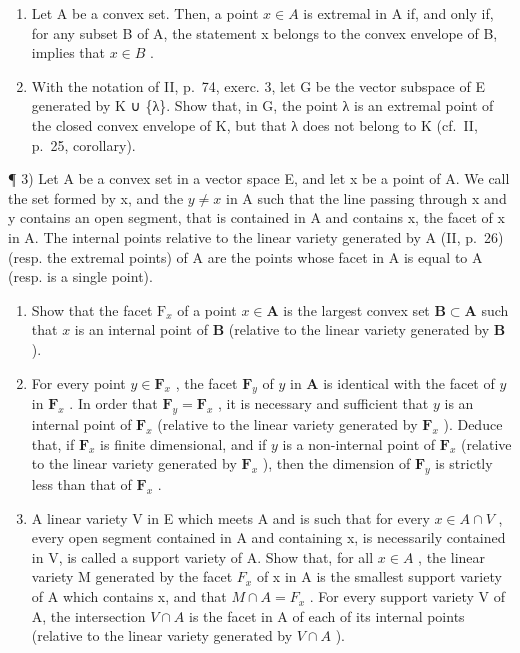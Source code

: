 \exercisegroup

\begin{enumerate}
\def\labelenumi{\arabic{enumi})}
\item
  Let A be a convex set. Then, a point \(x \in A\) is extremal in A if, and only if, for any subset B of A, the statement x belongs to the convex envelope of B, implies that \(x \in B\) .
\item
  With the notation of II, p.~74, exerc. 3, let G be the vector subspace of E generated by K ∪ \{λ\}. Show that, in G, the point λ is an extremal point of the closed convex envelope of K, but that λ does not belong to K (cf.~II, p.~25, corollary).
\end{enumerate}

¶ 3) Let A be a convex set in a vector space E, and let x be a point of A. We call the set formed by x, and the \(y \neq x\) in A such that the line passing through x and y contains an open segment, that is contained in A and contains x, the facet of x in A. The internal points relative to the linear variety generated by A (II, p.~26) (resp. the extremal points) of A are the points whose facet in A is equal to A (resp. is a single point).

\begin{enumerate}
\def\labelenumi{\alph{enumi})}
\item
  Show that the facet \(\mathrm{F}_x\) of a point \(x \in \mathbf{A}\) is the largest convex set \(\mathbf{B} \subset \mathbf{A}\) such that \(x\) is an internal point of \(\mathbf{B}\) (relative to the linear variety generated by \(\mathbf{B}\) ).
\item
  For every point \(y \in \mathbf{F}_x\) , the facet \(\mathbf{F}_y\) of \(y\) in \(\mathbf{A}\) is identical with the facet of \(y\) in \(\mathbf{F}_x\) . In order that \(\mathbf{F}_y = \mathbf{F}_x\) , it is necessary and sufficient that \(y\) is an internal point of \(\mathbf{F}_x\) (relative to the linear variety generated by \(\mathbf{F}_x\) ). Deduce that, if \(\mathbf{F}_x\) is finite dimensional, and if \(y\) is a non-internal point of \(\mathbf{F}_x\) (relative to the linear variety generated by \(\mathbf{F}_x\) ), then the dimension of \(\mathbf{F}_y\) is strictly less than that of \(\mathbf{F}_x\) .
\item
  A linear variety V in E which meets A and is such that for every \(x \in A \cap V\) , every open segment contained in A and containing x, is necessarily contained in V, is called a support variety of A. Show that, for all \(x \in A\) , the linear variety M generated by the facet \(F_{x}\) of x in A is the smallest support variety of A which contains x, and that \(M \cap A = F_{x}\) . For every support variety V of A, the intersection \(V \cap A\) is the facet in A of each of its internal points (relative to the linear variety generated by \(V \cap A\) ).
\end{enumerate}

